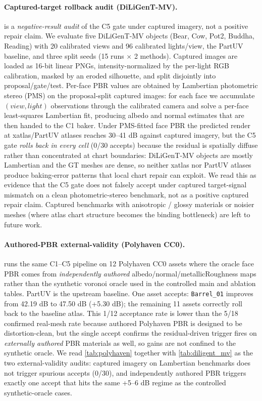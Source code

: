 \paragraph*{Captured-target rollback audit (DiLiGenT-MV).}

 is a \emph{negative-result audit} of the C5 gate
under captured imagery, not a positive repair claim. We evaluate five
DiLiGenT-MV objects (Bear, Cow, Pot2, Buddha, Reading) with 20
calibrated views and 96 calibrated lights/view, the PartUV baseline,
and three split seeds (15 runs $\times$ 2 methods). Captured images
are loaded as 16-bit linear PNGs, intensity-normalized by the per-light
RGB calibration, masked by an eroded silhouette, and split disjointly
into proposal/gate/test. Per-face PBR values are obtained by Lambertian
photometric stereo (PMS) on the proposal-split captured images: for
each face we accumulate $(view, light)$ observations through the
calibrated camera and solve a per-face least-squares Lambertian fit,
producing albedo and normal estimates that are then handed to the C1
baker. Under PMS-fitted face PBR the predicted render at xatlas/PartUV
atlases reaches 30--41 dB against captured imagery, but the C5 gate
\emph{rolls back in every cell} (0/30 accepts) because the residual is
spatially diffuse rather than concentrated at chart boundaries:
DiLiGenT-MV objects are mostly Lambertian and the GT meshes are dense,
so neither xatlas nor PartUV atlases produce baking-error patterns
that local chart repair can exploit. We read this as evidence that the
C5 gate does not falsely accept under captured target-signal mismatch
on a clean photometric-stereo benchmark, not as a positive captured
repair claim. Captured benchmarks with anisotropic / glossy materials
or noisier meshes (where atlas chart structure becomes the binding
bottleneck) are left to future work.

\paragraph*{Authored-PBR external-validity (Polyhaven CC0).}

 runs the same C1--C5 pipeline on 12 Polyhaven CC0
assets where the oracle face PBR comes from \emph{independently authored}
albedo/normal/metallicRoughness maps rather than the synthetic voronoi
oracle used in the controlled main and ablation tables. PartUV is the
upstream baseline. One asset accepts: \texttt{Barrel\_01} improves from
42.19 dB to 47.50 dB (+5.30 dB); the remaining 11 assets correctly roll
back to the baseline atlas. This 1/12 acceptance rate is lower than the
5/18 confirmed real-mesh rate because authored Polyhaven PBR is designed to be
distortion-clean, but the single accept confirms the residual-driven
trigger fires on \emph{externally authored} PBR materials as well, so
gains are not confined to the synthetic oracle. We read \cref{tab:polyhaven}
together with \cref{tab:diligent_mv} as the two external-validity
audits: captured imagery on Lambertian benchmarks does not trigger
spurious accepts (0/30), and independently authored PBR triggers
exactly one accept that hits the same +5--6 dB regime as the controlled
synthetic-oracle cases.

